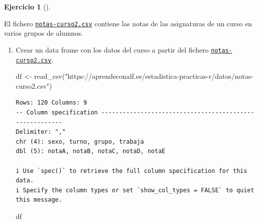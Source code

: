 \documentclass[
  a4paper,
]{scrreport}
\newenvironment{Shaded}{\begin{snugshade}}{\end{snugshade}}
\newcommand{\FunctionTok}[1]{\textcolor[rgb]{0.28,0.35,0.67}{#1}}
\newcommand{\NormalTok}[1]{\textcolor[rgb]{0.00,0.23,0.31}{#1}}
\newcommand{\OtherTok}[1]{\textcolor[rgb]{0.00,0.23,0.31}{#1}}
\newcommand{\StringTok}[1]{\textcolor[rgb]{0.13,0.47,0.30}{#1}}
\theoremstyle{definition}
\newtheorem{exercise}{Ejercicio}[chapter]
\theoremstyle{remark}
\begin{document}
\begin{exercise}[]\protect\hypertarget{exr-preprocesamiento-3}{}\label{exr-preprocesamiento-3}

El fichero \href{datos/notas-curso2.csv}{\texttt{notas-curso2.csv}}
contiene las notas de las asignaturas de un curso en varios grupos de
alumnos.

\begin{enumerate}
\def\labelenumi{\alph{enumi}.}
\item
  Crear un data frame con los datos del curso a partir del fichero
  \href{datos/notas-curso2.csv}{\texttt{notas-curso2.csv}}.

  \begin{tcolorbox}[enhanced jigsaw, breakable, toptitle=1mm, colbacktitle=quarto-callout-tip-color!10!white, rightrule=.15mm, opacityback=0, opacitybacktitle=0.6, titlerule=0mm, coltitle=black, colframe=quarto-callout-tip-color-frame, colback=white, bottomtitle=1mm, leftrule=.75mm, toprule=.15mm, title=\textcolor{quarto-callout-tip-color}{\faLightbulb}\hspace{0.5em}{Solución}, arc=.35mm, bottomrule=.15mm, left=2mm]

\begin{Shaded}
\begin{Highlighting}[]
\NormalTok{df }\OtherTok{\textless{}{-}} \FunctionTok{read\_csv}\NormalTok{(}\StringTok{"https://aprendeconalf.es/estadistica{-}practicas{-}r/datos/notas{-}curso2.csv"}\NormalTok{)}
\end{Highlighting}
\end{Shaded}

\begin{verbatim}
Rows: 120 Columns: 9
-- Column specification --------------------------------------------------------
Delimiter: ","
chr (4): sexo, turno, grupo, trabaja
dbl (5): notaA, notaB, notaC, notaD, notaE

i Use `spec()` to retrieve the full column specification for this data.
i Specify the column types or set `show_col_types = FALSE` to quiet this message.
\end{verbatim}

\begin{Shaded}
\begin{Highlighting}[]
\NormalTok{df}
\end{Highlighting}
\end{Shaded}


\end{tcolorbox}
\end{enumerate}
\end{exercise}
\end{document}

